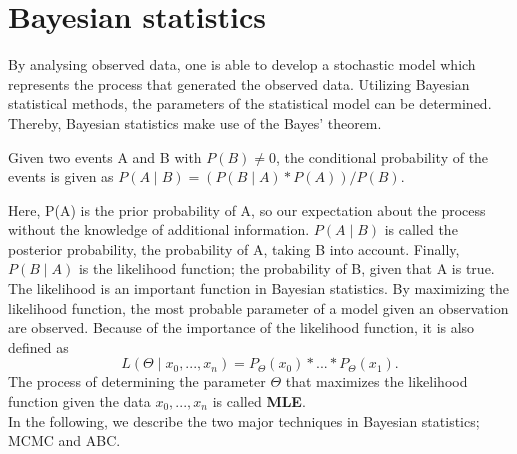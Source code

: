 \section{Bayesian statistics} 
\label{section:Baystat}
By analysing observed data, one is able to develop a stochastic model which represents the process that generated the observed data. Utilizing Bayesian statistical methods, the parameters of the statistical model can be determined. Thereby, Bayesian statistics make use of the Bayes' theorem.\cite{BayStat}\newline
\begin{definition}
Given two events A and B with $P(B) \neq 0$, the conditional probability of the events is given as $P(A \mid B) = (P(B \mid A) * P(A)) / P(B)$.
\end{definition}
Here, P(A) is the prior probability of A, so our expectation about the process without the knowledge of additional information. $P(A \mid B)$ is called the posterior probability, the probability of A, taking B into account. Finally, $P(B \mid A)$ is the likelihood function; the probability of B, given that A is true.\newline
The likelihood is an important function in Bayesian statistics. By maximizing the likelihood function, the most probable parameter of a model given an observation are observed. Because of the importance of the likelihood function, it is also defined as 
\begin{equation}
L(\Theta \mid x_0,...,x_n) = P_{\Theta}(x_0) * ... * P_{\Theta}(x_1).
\end{equation}
The process of determining the parameter $\Theta$ that maximizes the likelihood function given the data ${x_0,...,x_n}$ is called \textbf{\ac{MLE}}.\\

In the following, we describe the two major techniques in Bayesian statistics; \ac{MCMC} and \ac{ABC}.\\

